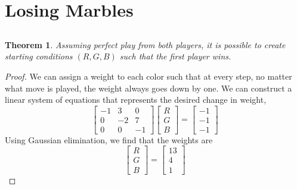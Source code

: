 \documentclass{article}
\newtheorem{theorem}{Theorem}
\begin{document}
\section{Losing Marbles}

\subsection{}

\begin{theorem} \label{thm:3a}
    Assuming perfect play from both players, it is possible to create starting conditions \((R, G, B)\) such that the first player wins.
\end{theorem}
\begin{proof}
    We can assign a weight to each color such that at every step, no matter what move is played, the weight always goes down by one.
    We can construct a linear system of equations that represents the desired change in weight,
    \begin{equation}
        \begin{bmatrix}
            -1 & 3 & 0 \\
            0 & -2 & 7 \\
            0 & 0 & -1
        \end{bmatrix}
        \begin{bmatrix}
            R \\
            G \\
            B
        \end{bmatrix}
        =
        \begin{bmatrix}
            -1 \\
            -1 \\
            -1
        \end{bmatrix}
    \end{equation}
    Using Gaussian elimination, we find that the weights are
    \begin{equation}
        \begin{bmatrix}
            R \\
            G \\
            B
        \end{bmatrix}
        =
        \begin{bmatrix}
            13 \\
            4 \\
            1
        \end{bmatrix}
    \end{equation}

\end{proof}
\end{document}
